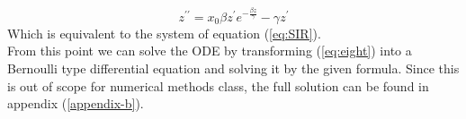 \begin{equation} \label{eq:eight}
	z^{\prime\prime} = x_{0} \beta z^{\prime} e^{-\frac{\beta z}{\gamma}} - \gamma z^{\prime}
\end{equation}
Which is equivalent to the system of equation (\ref{eq:SIR}). \\
From this point we can solve the ODE by transforming (\ref{eq:eight}) into a Bernoulli type differential equation and solving it
by the given formula. Since this is out of scope for numerical methods class, the full solution can be found in appendix (\ref{appendix-b}).

